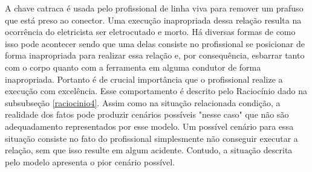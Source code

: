 A chave catraca é usada pelo profissional de linha viva para remover um prafuso que está preso ao conector. Uma execução inapropriada dessa relação resulta 
na ocorrência do eletricista ser eletrocutado e morto. Há diversas formas de como isso pode acontecer sendo que uma delas consiste no profissional se 
posicionar de forma inapropriada para realizar essa relação e, por consequência, esbarrar tanto com o corpo quanto com a ferramenta em alguma condutor 
de forma inapropriada. Portanto é de crucial importância que o profissional realize a execução com excelência. Esse comportamento é descrito pelo 
Raciocínio dado na subsubseção \ref{raciocinio4}. Assim como na situação relacionada condição, a realidade dos fatos pode produzir cenários possíveis "nesse caso" que não são 
adequadamento representados por esse modelo. Um possível cenário para essa situação consiste no fato do profissional simplesmente não conseguir executar 
a relação, sem que isso resulte em algum acidente. Contudo, a situação descrita pelo modelo apresenta o pior cenário possível. 
